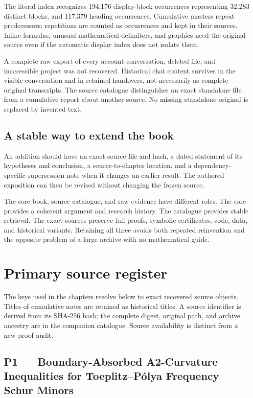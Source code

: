 \documentclass[
  10pt,
  a4paper,
  10pt,
  oneside,
  openany]{book}
\begin{document}
The literal index recognizes 194,176 display-block occurrences
representing 32,283 distinct blocks, and 117,379 heading occurrences.
Cumulative masters repeat predecessors; repetitions are counted as
occurrences and kept in their sources. Inline formulas, unusual
mathematical delimiters, and graphics need the original source even if
the automatic display index does not isolate them.

A complete raw export of every account conversation, deleted file, and
inaccessible project was not recovered. Historical chat content survives
in the visible conversation and in retained handovers, not necessarily
as complete original transcripts. The source catalogue distinguishes an
exact standalone file from a cumulative report about another source. No
missing standalone original is replaced by invented text.

\subsection{A stable way to extend the
book}\label{a-stable-way-to-extend-the-book}

An addition should have an exact source file and hash, a dated statement
of its hypotheses and conclusion, a source-to-chapter location, and a
dependency-specific supersession note when it changes an earlier result.
The authored exposition can then be revised without changing the frozen
source.

The core book, source catalogue, and raw evidence have different roles.
The core provides a coherent argument and research history. The
catalogue provides stable retrieval. The exact sources preserve full
proofs, symbolic certificates, code, data, and historical variants.
Retaining all three avoids both repeated reinvention and the opposite
problem of a large archive with no mathematical guide.

\section{Primary source register}\label{app-sources}

The keys used in the chapters resolve below to exact recovered source
objects. Titles of cumulative notes are retained as historical titles. A
source identifier is derived from its SHA-256 hash; the complete digest,
original path, and archive ancestry are in the companion catalogue.
Source availability is distinct from a new proof audit.

\subsection{P1 --- Boundary-Absorbed A2-Curvature Inequalities for
Toeplitz--Pólya Frequency Schur Minors}\label{source-p1}
\end{document}
